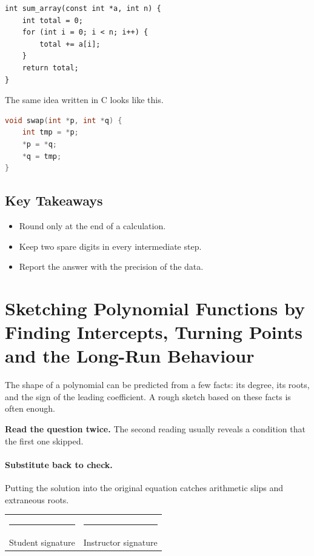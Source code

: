 \documentclass[11pt]{article}
\begin{document}
{\small\begin{verbatim}
int sum_array(const int *a, int n) {
    int total = 0;
    for (int i = 0; i < n; i++) {
        total += a[i];
    }
    return total;
}
\end{verbatim}}

The same idea written in C looks like this.

\begin{lstlisting}[language=C]
void swap(int *p, int *q) {
    int tmp = *p;
    *p = *q;
    *q = tmp;
}
\end{lstlisting}

\subsection*{Key Takeaways}
\begin{itemize}
\item Round only at the end of a calculation.
\item Keep two spare digits in every intermediate step.
\item Report the answer with the precision of the data.
\end{itemize}

\section{Sketching Polynomial Functions by Finding Intercepts, Turning Points and the Long-Run Behaviour}

The shape of a polynomial can be predicted from a few facts: its degree, its roots, and the sign of the leading coefficient. A rough sketch based on these facts is often enough.

\textbf{Read the question twice.} The second reading usually reveals a condition that the first one skipped.

\paragraph{Substitute back to check.} Putting the solution into the original equation catches arithmetic slips and extraneous roots.

\noindent\begin{tabular}{@{}p{}@{\hspace{0.06\textwidth}}p{}@{}}
\rule{6cm}{0.4pt} & \rule{6cm}{0.4pt} \\[2pt]
Student signature & Instructor signature \\
\end{tabular}
\end{document}
